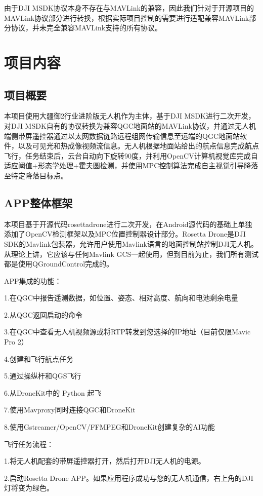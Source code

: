由于DJI MSDK协议本身不存在与MAVLink的兼容，因此我们针对于开源项目的MAVLink协议部分进行转换，根据实际项目控制的需要进行适配兼容MAVLink部分协议，并未完全兼容MAVLink支持的所有协议。

\chapter{项目内容}

\section{项目概要}

本项目使用大疆御2行业进阶版无人机作为主体，基于DJI MSDK进行二次开发，对DJI MSDK自有的协议转换为兼容QGC地面站的MAVLink协议，并通过无人机端侧带屏遥控器通过以太网数据链路远程组网传输信息至远端的QGC地面站软件，以及可见光和热成像视频流信息。无人机根据地面站给出的航点信息完成航点飞行，任务结束后，云台自动向下旋转90度，并利用OpenCV计算机视觉库完成自适应阈值+形态学处理+霍夫圆检测，并使用MPC控制算法完成自主视觉引导降落至特定降落目标点。

\section{APP整体框架}

本项目基于开源代码rosettadrone进行二次开发，在Android源代码的基础上单独添加了OpenCV检测框架以及MPC位置控制器设计部分。Rosetta Drone是DJI SDK的Mavlink包装器，允许用户使用Mavlink语言的地面控制站控制DJI无人机。从理论上讲，它应该与任何Mavlink GCS一起使用，但到目前为止，我们所有测试都是使用QGroundControl完成的。

APP集成的功能：

1.在QGC中报告遥测数据，如位置、姿态、相对高度、航向和电池剩余电量

2.从QGC返回启动的命令

3.在QGC中查看无人机视频源或将RTP转发到您选择的IP地址（目前仅限Mavic Pro 2）

4.创建和飞行航点任务

5.通过操纵杆和QGS飞行

6.从DroneKit中的 Python 起飞

7.使用Mavproxy同时连接QGC和DroneKit

8.使用Gstreamer/OpenCV/FFMPEG和DroneKit创建复杂的AI功能

飞行任务流程：

1.将无人机配套的带屏遥控器打开，然后打开DJI无人机的电源。

2.启动Rosetta Drone APP。如果应用程序成功与您的无人机通信，右上角的DJI灯将变为绿色。

